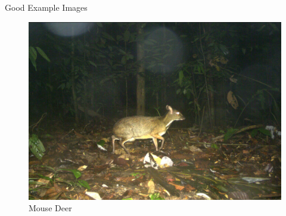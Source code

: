 \documentclass[10pt]{beamer}
\begin{document}
\begin{frame}{Good Example Images}
\begin{minipage}[c]{0.48\linewidth}
		\begin{figure}
			\includegraphics[width=\linewidth,height=.8\textheight,keepaspectratio]{images/example_mouse_deer.JPG}
			\caption{Mouse Deer}
		\end{figure}
	\end{minipage}
\end{frame}

\end{document}
